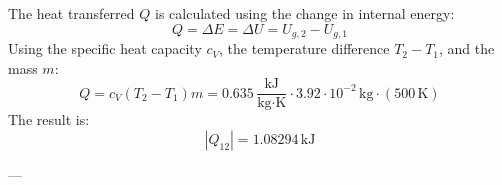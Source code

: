 The heat transferred \( Q \) is calculated using the change in internal energy:  
\[
Q = \Delta E = \Delta U = U_{g,2} - U_{g,1}
\]  
Using the specific heat capacity \( c_V \), the temperature difference \( T_2 - T_1 \), and the mass \( m \):  
\[
Q = c_V (T_2 - T_1) m = 0.635 \, \frac{\text{kJ}}{\text{kg·K}} \cdot 3.92 \cdot 10^{-2} \, \text{kg} \cdot (500 \, \text{K})
\]  
The result is:  
\[
|Q_{12}| = 1.08294 \, \text{kJ}
\]  

---
